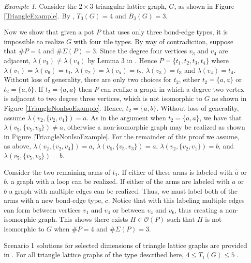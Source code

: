 \documentclass{elsarticle}
\theoremstyle{definition}
\theoremstyle{remark}
\newtheorem{example}[theorem]{Example}
\theoremstyle{plain}
\theoremstyle{plain}
\begin{document}
\begin{example}

Consider the $2\times 3$ triangular lattice graph, $G$, as shown in Figure \ref{TriangleExample}. By  \cite{Almodovar2019}, $T_3(G) = 4$ and $B_3(G) =3$. 


Now we show that given a pot $P$ that uses only three bond-edge types, it is impossible to realize $G$ with four tile types. By way of contradiction, suppose that $\#P =4$ and $\#\Sigma(P)=3$. Since the degree four vertices $v_3$ and $v_4$ are adjacent, $
\lambda(v_3) \neq \lambda(v_4)$ by Lemma 3 in \cite{ellis2014minimal}. Hence $P=\{t_1, t_2, t_3, t_4\}$ where $\lambda(v_1)=\lambda(v_6)=t_1$, $\lambda(v_2)=\lambda(v_5)=t_2$, $\lambda(v_3)=t_3$ and $\lambda(v_4)=t_4$. Without loss of generality, there are only two choices for $t_2$, either $t_2=\{a,a\}$ or $t_2=\{a,b\}$. If $t_2 = \{a,a\}$ then $P$ can realize a graph in which a degree two vertex is adjacent to two degree three vertices, which is not isomorphic to $G$ as shown in Figure \ref{TriangleNonIsoExample}. Hence, $t_2=\{a,b\}$. Without loss of generality, assume $\lambda(v_2, \{v_2,v_4\}) = a$. As in the argument when $t_2 = \{a,a\}$, we have that $\lambda(v_5,\{v_5,v_6\}) \neq a$, otherwise a non-isomorphic graph may be realized as shown in Figure \ref{TriangleNonIsoExample}. For the remainder of this proof we assume, as above, $\lambda(v_2, \{v_2,v_4\}) = a$, $\lambda(v_5,\{v_5,v_3\}) = a$, $\lambda(v_2,\{v_2,v_1\}) = b$, and $\lambda(v_5,\{v_5,v_6\}) = b$.


Consider the two remaining arms of $t_1$. If either of these arms is labeled with $\hat{a}$ or $b$, a graph with a loop can be realized. If either of the arms are labeled with $a$ or $\hat{b}$ a graph with  multiple edges can be realized. Thus, we must label both of the arms with a new bond-edge type, $c$. Notice that with this labeling  multiple edges can form between vertices $v_1$ and $v_4$ or between $v_4$ and $v_6$, thus creating a non-isomorphic graph. This shows there exists $H \in \mathcal{O}(P)$ such that $H$ is not isomorphic to $G$ when $\# P =4$ and $\# \Sigma(P) =3$. \par
Scenario 1 solutions for selected dimensions of triangle lattice graphs are provided in \cite{repository, Almodovar2019}. For all triangle lattice graphs of the type described here, $4 \leq T_1(G) \leq 5$ \cite{repository}.


\begin{figure}[h] \centering
{}
\end{figure}
\end{example}
\end{document}
